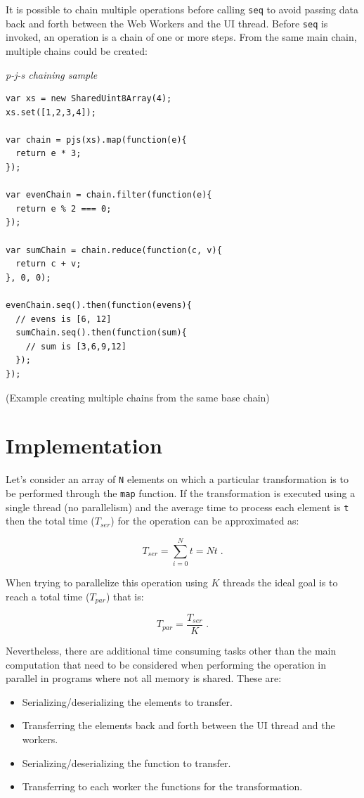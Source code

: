 \documentclass[runningheads,a4paper]{llncs}
\begin{document}
It is possible to chain multiple operations before calling \verb+seq+ to avoid passing data back and forth between the Web Workers and the UI thread. Before \verb+seq+ is invoked, an operation is a chain of one or more steps. From the same main chain, multiple chains could be created:
\medskip

\noindent
{\it p-j-s chaining sample}
\begin{verbatim}
var xs = new SharedUint8Array(4);
xs.set([1,2,3,4]);

var chain = pjs(xs).map(function(e){
  return e * 3;
});

var evenChain = chain.filter(function(e){
  return e % 2 === 0;
});

var sumChain = chain.reduce(function(c, v){
  return c + v;
}, 0, 0);

evenChain.seq().then(function(evens){
  // evens is [6, 12]
  sumChain.seq().then(function(sum){
    // sum is [3,6,9,12]
  });
});
\end{verbatim}
%
\noindent
{\small (Example creating multiple chains from the same base chain)}\\

\section{Implementation}\label{sec:implementation}
Let's consider an array of \verb+N+ elements on which a particular transformation is to be performed through the \verb+map+ function. If the transformation is executed using a single thread (no parallelism) and the average time to process each element is \verb+t+ then the total time (\(T_{ser}\)) for the operation can be approximated as:

\begin{equation}
  T_{ser} = \sum_{i = 0}^{N}t = Nt \;  .
\end{equation}

When trying to parallelize this operation using \(K\) threads the ideal goal is to reach a total time (\(T_{par}\)) that is:

\begin{equation}
  T_{par} = \frac{T_{ser}}{K} \;  .
\end{equation}

Nevertheless, there are additional time consuming tasks other than the main computation that need to be considered when performing the operation in parallel in programs where not all memory is shared. These are:
\begin{itemize}
  \item Serializing/deserializing the elements to transfer.
  \item Transferring the elements back and forth between the UI thread and the workers.
  \item Serializing/deserializing the function to transfer.
  \item Transferring to each worker the functions for the transformation.
\end{itemize}
\end{document}
